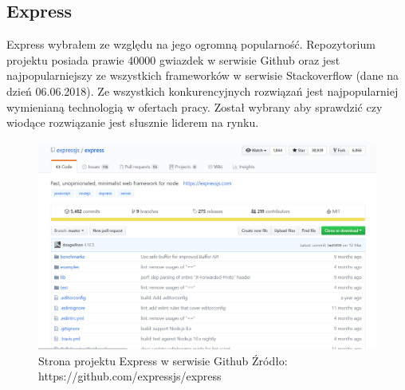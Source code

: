 \documentclass[12pt]{report}
\begin{document}
    \subsection{Express}
      Express wybrałem ze względu na jego ogromną popularność.
      Repozytorium projektu posiada prawie 40000 gwiazdek w serwisie Github oraz jest najpopularniejszy ze wszystkich frameworków w serwisie Stackoverflow (dane na dzień 06.06.2018).
      Ze wszystkich konkurencyjnych rozwiązań jest najpopularniej wymienianą technologią w ofertach pracy.
      Został wybrany aby sprawdzić czy wiodące rozwiązanie jest słusznie liderem na rynku.
      \begin{figure}[!hb]
        \centering
        \includegraphics[width=\textwidth,height=\textheight,keepaspectratio]{express.png} 
        \caption{Strona projektu Express w serwisie Github \newline Źródło: https://github.com/expressjs/express}
      \end{figure}
\end{document}
